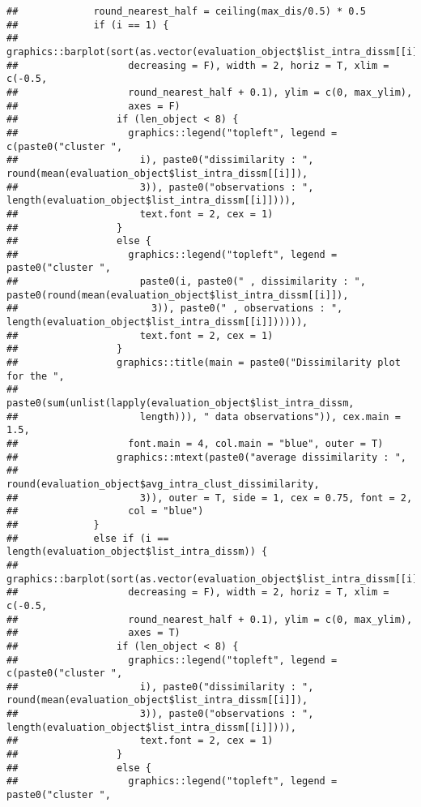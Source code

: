 \documentclass[
]{article}
\begin{document}
\begin{verbatim}
##             round_nearest_half = ceiling(max_dis/0.5) * 0.5
##             if (i == 1) {
##                 graphics::barplot(sort(as.vector(evaluation_object$list_intra_dissm[[i]]), 
##                   decreasing = F), width = 2, horiz = T, xlim = c(-0.5, 
##                   round_nearest_half + 0.1), ylim = c(0, max_ylim), 
##                   axes = F)
##                 if (len_object < 8) {
##                   graphics::legend("topleft", legend = c(paste0("cluster ", 
##                     i), paste0("dissimilarity : ", round(mean(evaluation_object$list_intra_dissm[[i]]), 
##                     3)), paste0("observations : ", length(evaluation_object$list_intra_dissm[[i]]))), 
##                     text.font = 2, cex = 1)
##                 }
##                 else {
##                   graphics::legend("topleft", legend = paste0("cluster ", 
##                     paste0(i, paste0(" , dissimilarity : ", paste0(round(mean(evaluation_object$list_intra_dissm[[i]]), 
##                       3)), paste0(" , observations : ", length(evaluation_object$list_intra_dissm[[i]]))))), 
##                     text.font = 2, cex = 1)
##                 }
##                 graphics::title(main = paste0("Dissimilarity plot for the ", 
##                   paste0(sum(unlist(lapply(evaluation_object$list_intra_dissm, 
##                     length))), " data observations")), cex.main = 1.5, 
##                   font.main = 4, col.main = "blue", outer = T)
##                 graphics::mtext(paste0("average dissimilarity : ", 
##                   round(evaluation_object$avg_intra_clust_dissimilarity, 
##                     3)), outer = T, side = 1, cex = 0.75, font = 2, 
##                   col = "blue")
##             }
##             else if (i == length(evaluation_object$list_intra_dissm)) {
##                 graphics::barplot(sort(as.vector(evaluation_object$list_intra_dissm[[i]]), 
##                   decreasing = F), width = 2, horiz = T, xlim = c(-0.5, 
##                   round_nearest_half + 0.1), ylim = c(0, max_ylim), 
##                   axes = T)
##                 if (len_object < 8) {
##                   graphics::legend("topleft", legend = c(paste0("cluster ", 
##                     i), paste0("dissimilarity : ", round(mean(evaluation_object$list_intra_dissm[[i]]), 
##                     3)), paste0("observations : ", length(evaluation_object$list_intra_dissm[[i]]))), 
##                     text.font = 2, cex = 1)
##                 }
##                 else {
##                   graphics::legend("topleft", legend = paste0("cluster ", 

\end{verbatim}
\end{document}
